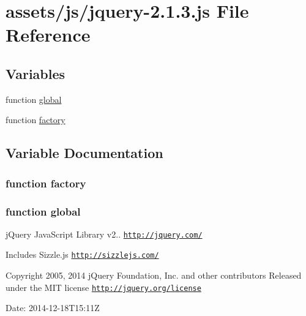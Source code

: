 \hypertarget{jquery-2_81_83_8js}{}\section{assets/js/jquery-\/2.1.3.js File Reference}
\label{jquery-2_81_83_8js}
\subsection*{Variables}
\begin{DoxyCompactItemize}
\item 
function \hyperlink{jquery-2_81_83_8js_a57efe929cc6b44042891d05e15cec785}{global}
\item 
function \hyperlink{jquery-2_81_83_8js_abf075bdbe59fd2c3336ed052c9c72b31}{factory}
\end{DoxyCompactItemize}


\subsection{Variable Documentation}
\hypertarget{jquery-2_81_83_8js_abf075bdbe59fd2c3336ed052c9c72b31}{}
\subsubsection[{factory}]{\setlength{\rightskip}{0pt plus 5cm}function factory}\label{jquery-2_81_83_8js_abf075bdbe59fd2c3336ed052c9c72b31}
\hypertarget{jquery-2_81_83_8js_a57efe929cc6b44042891d05e15cec785}{}
\subsubsection[{global}]{\setlength{\rightskip}{0pt plus 5cm}function global}\label{jquery-2_81_83_8js_a57efe929cc6b44042891d05e15cec785}
j\+Query Java\+Script Library v2.. \href{http://jquery.com/}{\tt http\+://jquery.\+com/}

Includes Sizzle.\+js \href{http://sizzlejs.com/}{\tt http\+://sizzlejs.\+com/}

Copyright 2005, 2014 j\+Query Foundation, Inc. and other contributors Released under the M\+I\+T license \href{http://jquery.org/license}{\tt http\+://jquery.\+org/license}

Date\+: 2014-\/12-\/18\+T15\+:11\+Z 